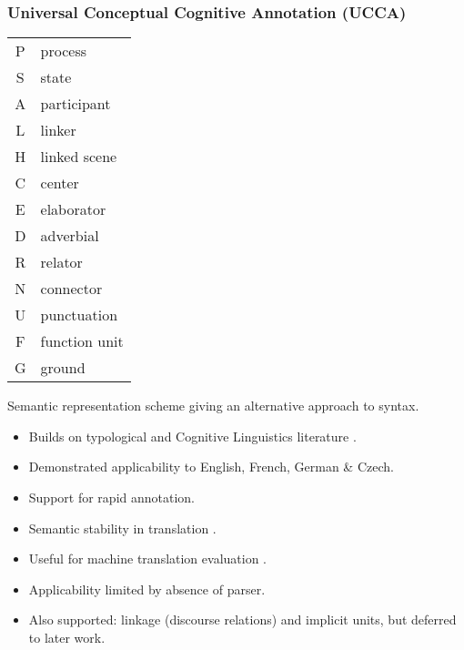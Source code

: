 \documentclass[t]{beamer}
\begin{document}
\begin{frame}
\frametitle{Universal Conceptual Cognitive Annotation (UCCA)}
\begin{wraptable}{r}{35mm}
  \vspace{-5mm}
  \begin{adjustbox}{margin=2mm,frame}
  \begin{tabular}{cl}
	  P & process \\
	  S & state \\
	  A & participant \\
	  L & linker \\
	  H & linked scene \\
	  C & center \\
	  E & elaborator \\
	  D & adverbial \\
	  R & relator \\
	  N & connector \\
	  U & punctuation \\
	  F & function unit \\
	  G & ground
  \end{tabular}
  \end{adjustbox}
\end{wraptable}
Semantic representation scheme giving an alternative approach to syntax.
\begin{itemize}
 \item Builds on typological and Cognitive Linguistics literature \cite{Dixon:basic,croft2004cognitive}.
 \item Demonstrated applicability to English, French, German \& Czech.
 \item Support for rapid annotation.
 \pause
 \item Semantic stability in translation \cite{sulem2015conceptual}.
 \item Useful for machine translation evaluation \cite{birch2016hume}.
 \item Applicability limited by absence of parser.
 \pause
 \item Also supported: linkage (discourse relations) and implicit units,
 but deferred to later work.
\end{itemize}
\end{frame}
\end{document}
